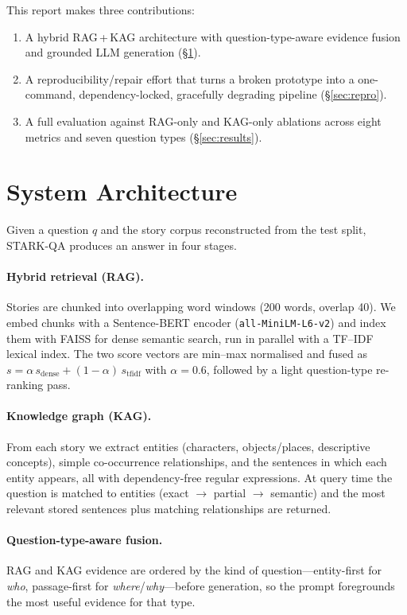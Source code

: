 \documentclass[11pt]{article}
\begin{document}
This report makes three contributions:
\begin{enumerate}[noitemsep]
    \item A hybrid RAG\,+\,KAG architecture with question-type-aware evidence
    fusion and grounded LLM generation (\S\ref{sec:system}).
    \item A reproducibility/repair effort that turns a broken prototype into a
    one-command, dependency-locked, gracefully degrading pipeline
    (\S\ref{sec:repro}).
    \item A full evaluation against RAG-only and KAG-only ablations across eight
    metrics and seven question types (\S\ref{sec:results}).
\end{enumerate}

\section{System Architecture}
\label{sec:system}
Given a question $q$ and the story corpus reconstructed from the test split,
STARK-QA produces an answer in four stages.

\paragraph{Hybrid retrieval (RAG).} Stories are chunked into overlapping
word windows (200 words, overlap 40). We embed chunks with a
Sentence-BERT encoder \citep{reimers-gurevych-2019-sentencebert}
(\texttt{all-MiniLM-L6-v2}) and index them with FAISS
\citep{johnson2021faiss} for dense semantic search, run in parallel with a
TF--IDF lexical index. The two score vectors are min--max normalised and fused as
$s = \alpha\, s_{\text{dense}} + (1-\alpha)\, s_{\text{tfidf}}$ with
$\alpha = 0.6$, followed by a light question-type re-ranking pass.

\paragraph{Knowledge graph (KAG).} From each story we extract entities
(characters, objects/places, descriptive concepts), simple co-occurrence
relationships, and the sentences in which each entity appears, all with
dependency-free regular expressions. At query time the question is matched to
entities (exact $\rightarrow$ partial $\rightarrow$ semantic) and the most
relevant stored sentences plus matching relationships are returned.

\paragraph{Question-type-aware fusion.} RAG and KAG evidence are ordered by the
kind of question---entity-first for \emph{who}, passage-first for
\emph{where}/\emph{why}---before generation, so the prompt foregrounds the most
useful evidence for that type.
\end{document}
